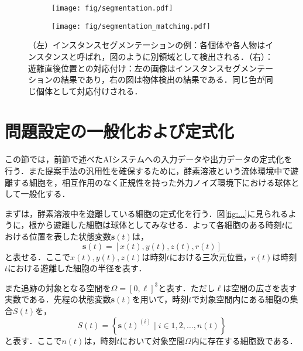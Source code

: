     \begin{figure}[t]
        \centering
        \begin{subfigure}[b]{.4\linewidth}
            \centering
            \texttt{[image: fig/segmentation.pdf]}
            \label{fig:instance_segmentation}
        \end{subfigure}
        \hfill
        \begin{subfigure}[b]{.4\linewidth}
            \centering
            \texttt{[image: fig/segmentation\_matching.pdf]}
            \label{fig:instance_segmentation}
        \end{subfigure}
        \caption[インスタンスセグメンテーションの例と遊離直後位置との対応付け]{（左）インスタンスセグメンテーションの例：各個体や各人物はインスタンスと呼ばれ，図のように別領域として検出される．（右）：遊離直後位置との対応付け：左の画像はインスタンスセグメンテーションの結果であり，右の図は物体検出の結果である．同じ色が同じ個体として対応付けされる．}
        \label{fig:instance_segmentation_and_matching}
    \end{figure}

\section{問題設定の一般化および定式化}
\label{sec:setting}

この節では，前節で述べたAIシステムへの入力データや出力データの定式化を行う．また提案手法の汎用性を確保するために，酵素溶液という流体環境中で遊離する細胞を，相互作用のなく正規性を持った外力ノイズ環境下における球体として一般化する．

まずは，酵素溶液中を遊離している細胞の定式化を行う．図\ref{fig:...}に見られるように，根から遊離した細胞は球体としてみなせる．よって各細胞のある時刻$t$における位置を表した状態変数$\bm{s}(t)$は，
\begin{equation}
    \label{eq:continous_state_vecotr}
    \bm{s}(t) = \left[x(t), y(t), z(t), r(t)\right]
\end{equation}
と表せる．ここで$x(t),y(t),z(t)$は時刻$t$における三次元位置，$r(t)$は時刻$t$における遊離した細胞の半径を表す．

また追跡の対象となる空間を$\Omega = \left[0, \ell\right]^3$と表す．ただし$\ell$は空間の広さを表す実数である．先程の状態変数$\bm{s}(t)$を用いて，時刻$t$で対象空間内にある細胞の集合$S(t)$を，
\begin{equation}
    \label{eq:set_of_cells_at_time}
    S(t) = \left\{\bm{s}(t)^{(i)} \mid i \in 1,2,\dots,n(t)\right\}
\end{equation}
と表す．ここで$n(t)$は，時刻$t$において対象空間$\Omega$内に存在する細胞数である．

